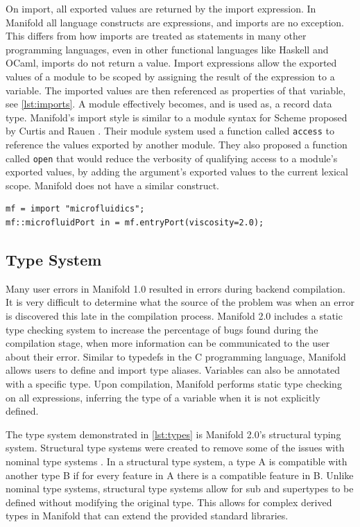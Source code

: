 On import, all exported values are returned by the import
expression. In Manifold all language constructs are
expressions, and imports are no exception. This differs from how imports are
treated as statements in many other
programming languages, even in other functional languages like Haskell and
OCaml, imports do not return a value.  Import expressions allow the
exported values of a module to be scoped by assigning the result of the expression
to a variable. The imported values are then referenced as properties of that
variable, see \autoref{lst:imports}. A module effectively becomes, and is used as,
a record data type. Manifold's import style is similar to a module syntax for Scheme proposed by
Curtis and Rauen \cite{Curtis:1990:MSS:91556.91573}. Their module system used
a function called \texttt{access} to reference the values exported by another
module. They also proposed a function called \texttt{open} that would reduce
the verbosity of qualifying access to a module's exported values, by adding the
argument's exported values to the current lexical scope. Manifold does not
have a similar construct.

\begin{lstlisting}[label=lst:imports, caption=A module imported into a Manifold file]
mf = import "microfluidics";
mf::microfluidPort in = mf.entryPort(viscosity=2.0);
\end{lstlisting}

\subsection{Type System}

Many user errors in Manifold 1.0 resulted in errors during backend compilation. It is very difficult
to determine what the source of the problem was when an error is discovered this late in the compilation
process. Manifold 2.0 includes a static type checking system to increase the percentage of bugs found during
the compilation stage, when more information can be communicated to the user about their error.
Similar to typedefs in the C programming language, Manifold allows users to define and import type aliases.
Variables can also be annotated with a specific type. Upon compilation,
Manifold performs static type checking on all expressions, inferring the type of a variable when it
is not explicitly defined.

The type system demonstrated in \autoref{lst:types} is Manifold 2.0's structural typing system.
Structural type systems were
created to remove some of the issues with nominal type systems
\cite{Gil:2008:WIS:1449764.1449771}. In a structural
type system, a type A is compatible with another type B if for every feature in
A there is a compatible feature in B. Unlike nominal type systems, structural
type systems allow for sub and supertypes to be defined without
modifying the original type. This allows for complex derived types in Manifold that
can extend the provided standard libraries.

